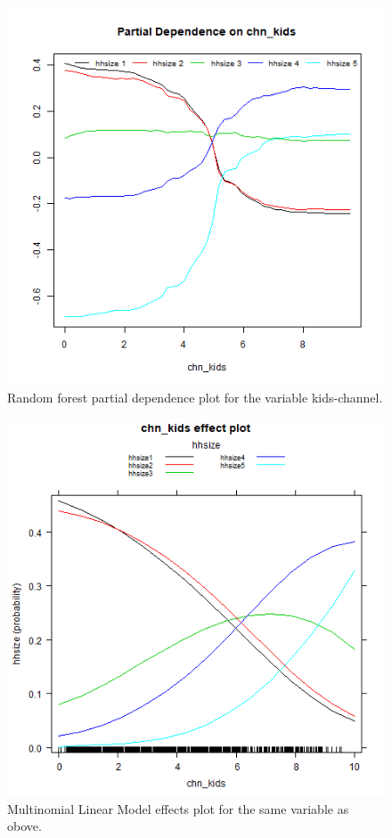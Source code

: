 \documentclass[]{article}
\begin{document}
\pagebreak

\begin{figure}

{\centering \includegraphics[width=0.55\linewidth]{../data/partialplot.rf.chn_kids} 

}

\caption{\label{fig:fig11} Random forest partial dependence plot for the variable kids-channel.}\label{fig:unnamed-chunk-31}
\end{figure}

\begin{figure}

{\centering \includegraphics[width=0.55\linewidth]{../data/partialplot.mnr.chn_kids} 

}

\caption{\label{fig:fig12} Multinomial Linear Model effects plot for the same variable as obove.}\label{fig:unnamed-chunk-32}
\end{figure}

\pagebreak
\end{document}
